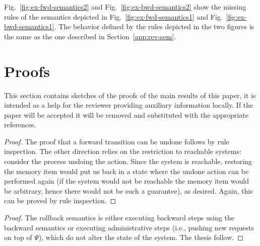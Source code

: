 \documentclass[runningheads]{llncs}
\begin{document}
Fig.~\ref{fig:ex-fwd-semantics2} and Fig.~\ref{fig:ex-bwd-semantics2} show the
missing rules of the semantics depicted in Fig.~\ref{fig:ex-fwd-semantics1} and Fig.~\ref{fig:ex-bwd-semantics1}.
The behavior defined by the rules depicted in the two figures is the same as the
one described in Section~\ref{app:rev-sem}.



\section{Proofs}\label{app:proofs}
This section contains sketches of the proofs of the main results of this paper,
it is intended as a help for the reviewer providing auxiliary information
locally. If the
paper will be accepted it will be removed and substituted with the appropriate
references.  


\looplemma

\begin{proof}
  The proof that a forward transition can be undone follows by rule inspection. The other direction relies on the restriction to reachable systems: consider the process undoing the action. Since the system is reachable, restoring the memory item would put us back in a state where the undone action can be performed again (if the system would not be reachable the memory item would be arbitrary, hence there would not be such a guarantee), as desired. Again, this can be proved by rule inspection.
\end{proof}

\rollbacksoundness

\begin{proof}
The rollback semantics is either executing backward steps using the backward
semantics or executing administrative steps (i.e., pushing new requests on top of
$\Psi$), which do not alter the state of the system. The thesis follow.
\end{proof}
\end{document}
